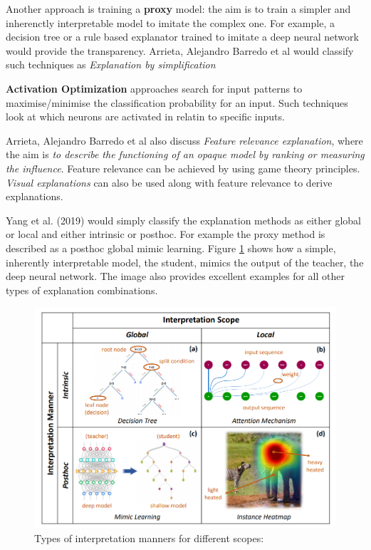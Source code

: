 \documentclass[proposal]{softeng}
\begin{document}
Another approach is training a \textbf{proxy} model: the aim is to train a simpler and inherenctly interpretable model to imitate the complex one. For example, a decision tree or a rule based explanator trained to imitate a deep neural network would provide the transparency. Arrieta, Alejandro Barredo et al \cite{BarredoArrietaAlejandro2020EAIX} would classify such techniques as \textit{Explanation by simplification}

\textbf{Activation Optimization} approaches search for input patterns to maximise/minimise the classification probability for an input. Such techniques look at which neurons are activated in relatin to specific inputs.

Arrieta, Alejandro Barredo et al also discuss \textit{Feature relevance explanation}, where the aim is \textit{to describe the functioning of an opaque model by ranking or measuring the influence}. Feature relevance can be achieved by using game theory principles. \textit{Visual explanations} can also be used along with feature relevance to derive explanations. 

Yang et al. (2019) would simply classify the explanation methods as either global or local and either intrinsic or posthoc. For example the proxy method is described as a posthoc global mimic learning. Figure \ref{fig:interpretation_scope} shows how a simple, inherently interpretable model, the student, mimics the output of the teacher, the deep neural network. The image also provides excellent examples for all other types of explanation combinations.

\begin{figure}[h!]
\centering
  \includegraphics[width=.8\textwidth]{images/interpretation_scope.png}
  \caption{Types of interpretation manners for different scopes:\cite{YangFan2019EEWG}}
  \label{fig:interpretation_scope}
\end{figure}
\end{document}
